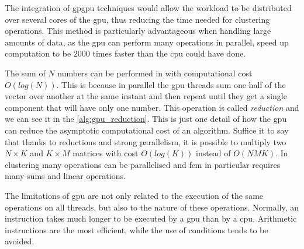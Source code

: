 \bigskip
\noindent The integration of \gls{gpgpu} techniques would allow the workload to be distributed over several cores of the \gls{gpu}, thus reducing the time needed for clustering operations. This method is particularly advantageous when handling large amounts of data, as the \gls{gpu} can perform many operations in parallel, speed up computation to be $2000$ times faster than the \gls{cpu} could have done.

\noindent The sum of $N$ numbers can be performed in with computational cost $O(log(N))$. This is because in parallel the \gls{gpu} threads sum one half of the vector over another at the same instant and then repeat until they get a single component that will have only one number. This operation is called \textit{reduction} and we can see it in the \cref{alg:gpu_reduction}. This is just one detail of how the \gls{gpu} can reduce the asymptotic computational cost of an algorithm. Suffice it to say that thanks to reductions and strong parallelism, it is possible to multiply two $N\times K$ and $K\times M$ matrices with cost $O(log(K))$ instead of $O(NMK)$. In clustering many operations can be parallelised and \gls{fcm} in particular requires many sums and linear operations.

\noindent The limitations of \gls{gpu} are not only related to the execution of the same operations on all threads, but also to the nature of these operations. Normally, an instruction takes much longer to be executed by a \gls{gpu} than by a \gls{cpu}. Arithmetic instructions are the most efficient, while the use of conditions tends to be avoided.



